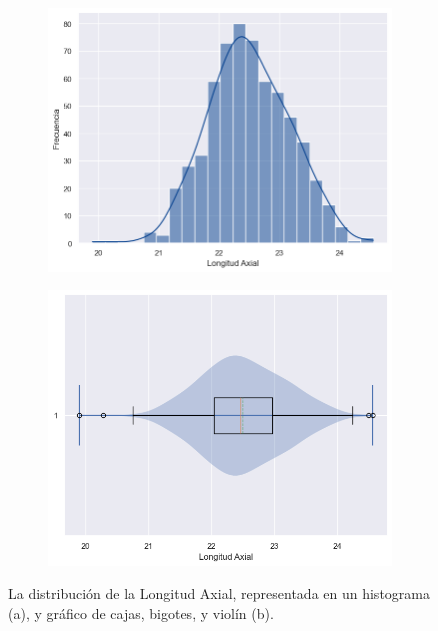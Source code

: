 \documentclass[a4paper,10pt,twocolumn]{article}
\begin{document}
	 \begin{figure}[htb]
		\begin{subfigure}{.49\linewidth}
			\includegraphics[height=.95\linewidth, width=.95\linewidth]{assets/AL_hist}
			\caption{}
			\label{fig:1a}
		\end{subfigure}
		\begin{subfigure}{.49\linewidth}
			\includegraphics[height=.95\linewidth, width=.95\linewidth]{assets/AL_boxplot}
			\caption{}
			\label{fig:1b}
		\end{subfigure}
		\caption{La distribución de la Longitud Axial, representada en un histograma (a), y gráfico de cajas, bigotes, y violín (b).}
		\label{fig:1}
	\end{figure}
	
\end{document}

